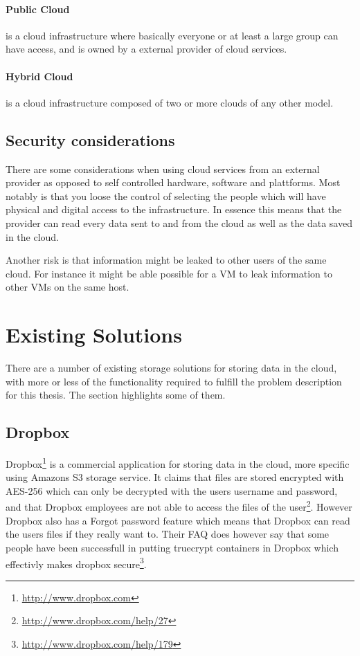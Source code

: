 \documentclass[pdftex,english,10pt,b5paper,twoside]{book}
\begin{document}
\paragraph{Public Cloud} is a cloud infrastructure where basically everyone or
at least a large group can have access, and is owned by a external provider of
cloud services.

\paragraph{Hybrid Cloud} is a cloud infrastructure composed of two or more
clouds of any other model. 

\subsection{Security considerations} 
There are some considerations when using cloud services from an external provider 
as opposed to self controlled hardware, software and plattforms. Most notably
is that you loose the control of selecting the people which will have physical
and digital access to the infrastructure. In essence this means that the
provider can read every data sent to and from the cloud as well as the data
saved in the cloud.

Another risk is that information might be leaked to other users of the same
cloud. For instance it might be able possible for a \ac{VM} to leak information
to other \ac{VM}s on the same host. 

\section{Existing Solutions}
There are a number of existing storage solutions for storing data in the cloud,
with more or less of the functionality required to fulfill the problem
description for this thesis. The section highlights some of them.

\subsection{Dropbox} Dropbox\footnote{\url{http://www.dropbox.com}} is a
commercial application for storing data in the cloud, more specific using
Amazons S3 storage service. It claims that files are stored encrypted with
\ac{AES}-256 which can only be decrypted with the users username and password,
and that Dropbox employees are not able to access the files of the
user\footnote{\url{http://www.dropbox.com/help/27}}. However Dropbox also has a
Forgot password feature which means that Dropbox can read the users files if
they really want to. Their \ac{FAQ} does however say that some people have been
successfull in putting truecrypt containers in Dropbox which effectivly makes
dropbox secure\footnote{\url{http://www.dropbox.com/help/179}}.
\end{document}
